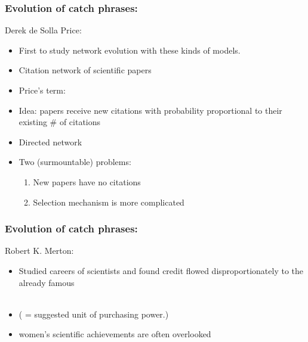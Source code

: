 \begin{frame}
  \frametitle{Evolution of catch phrases:}

  \begin{block}{Derek de Solla Price:}
  \begin{itemize}
  \item<1-> First to study network evolution
    with these kinds of models.
  \item<2-> Citation network of scientific papers
  \item<3-> Price's term: 
  \item<4-> Idea: papers receive new citations with probability proportional
    to their existing \# of citations
  \item<5-> Directed network
  \item<6-> Two (surmountable) problems:
    \begin{enumerate}
    \item New papers have no citations
    \item Selection mechanism is more complicated
    \end{enumerate}
  \end{itemize}
  \end{block}

\end{frame}

\begin{frame}
  \frametitle{Evolution of catch phrases:}

  \begin{block}{Robert K. Merton: }
  \begin{itemize}
  \item<+-> 
    Studied careers of scientists and found credit
    flowed disproportionately to the already famous\\
    \medskip
    \\
  \item<+->
    ( = suggested unit of purchasing power.)
  \item<+->
    { women's scientific achievements are often overlooked}
  \end{itemize}
  \end{block}

\end{frame}

